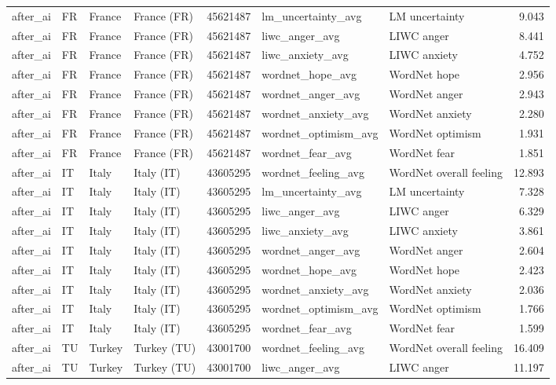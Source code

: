 \begin{tabular}{llllrllr}
after\_ai & FR & France & France (FR) & 45621487 & lm\_uncertainty\_avg & LM uncertainty & 9.043 \\
after\_ai & FR & France & France (FR) & 45621487 & liwc\_anger\_avg & LIWC anger & 8.441 \\
after\_ai & FR & France & France (FR) & 45621487 & liwc\_anxiety\_avg & LIWC anxiety & 4.752 \\
after\_ai & FR & France & France (FR) & 45621487 & wordnet\_hope\_avg & WordNet hope & 2.956 \\
after\_ai & FR & France & France (FR) & 45621487 & wordnet\_anger\_avg & WordNet anger & 2.943 \\
after\_ai & FR & France & France (FR) & 45621487 & wordnet\_anxiety\_avg & WordNet anxiety & 2.280 \\
after\_ai & FR & France & France (FR) & 45621487 & wordnet\_optimism\_avg & WordNet optimism & 1.931 \\
after\_ai & FR & France & France (FR) & 45621487 & wordnet\_fear\_avg & WordNet fear & 1.851 \\
after\_ai & IT & Italy & Italy (IT) & 43605295 & wordnet\_feeling\_avg & WordNet overall feeling & 12.893 \\
after\_ai & IT & Italy & Italy (IT) & 43605295 & lm\_uncertainty\_avg & LM uncertainty & 7.328 \\
after\_ai & IT & Italy & Italy (IT) & 43605295 & liwc\_anger\_avg & LIWC anger & 6.329 \\
after\_ai & IT & Italy & Italy (IT) & 43605295 & liwc\_anxiety\_avg & LIWC anxiety & 3.861 \\
after\_ai & IT & Italy & Italy (IT) & 43605295 & wordnet\_anger\_avg & WordNet anger & 2.604 \\
after\_ai & IT & Italy & Italy (IT) & 43605295 & wordnet\_hope\_avg & WordNet hope & 2.423 \\
after\_ai & IT & Italy & Italy (IT) & 43605295 & wordnet\_anxiety\_avg & WordNet anxiety & 2.036 \\
after\_ai & IT & Italy & Italy (IT) & 43605295 & wordnet\_optimism\_avg & WordNet optimism & 1.766 \\
after\_ai & IT & Italy & Italy (IT) & 43605295 & wordnet\_fear\_avg & WordNet fear & 1.599 \\
after\_ai & TU & Turkey & Turkey (TU) & 43001700 & wordnet\_feeling\_avg & WordNet overall feeling & 16.409 \\
after\_ai & TU & Turkey & Turkey (TU) & 43001700 & liwc\_anger\_avg & LIWC anger & 11.197 \\

\end{tabular}
